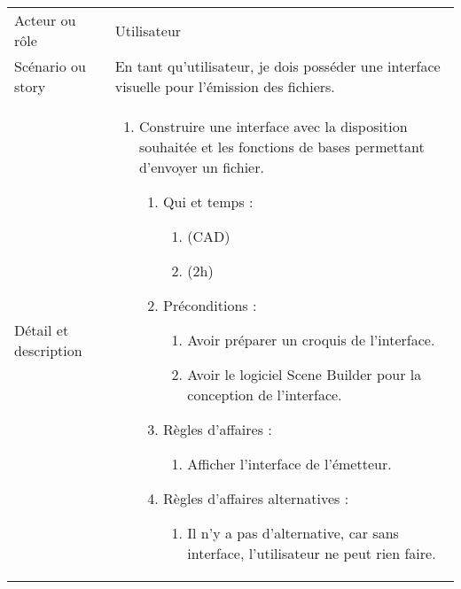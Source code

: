 \begin{longtable}{|l|p{}|}
\hline
    \rowcolor{Gray}
    \multicolumn{2}{|l|}{2} \\
\hline
    Acteur ou rôle & Utilisateur \\
\hline
    Scénario ou story & En tant qu’utilisateur, je
    dois posséder une interface
    visuelle pour l’émission des
    fichiers. \\
\hline
    Détail et description &
        \begin{enumerate}[label*=\arabic*.]
            \item Construire une interface avec
                la disposition souhaitée et les
                fonctions de bases permettant
                d’envoyer un fichier.
                \begin{enumerate}[label*=\arabic*.]
                                \item Qui et temps :
                                \begin{enumerate}[label*=\arabic*.]
                                    \item (CAD)
                                    \item (2h)
                                \end{enumerate}
                                \item Préconditions :
                                \begin{enumerate}[label*=\arabic*.]
                                    \item Avoir préparer un croquis de l'interface.
                                    \item Avoir le logiciel Scene Builder pour la conception de l'interface.
                                \end{enumerate}
                                \item Règles d'affaires :
                                \begin{enumerate}[label*=\arabic*.]
                                    \item Afficher l'interface de l'émetteur.
                                \end{enumerate}
                                \item Règles d'affaires alternatives :
                                \begin{enumerate}[label*=\arabic*.]
                                    \item Il n'y a pas d'alternative, car sans interface, l'utilisateur ne peut rien faire.

\end{enumerate}
\end{enumerate}
\end{enumerate}
\end{longtable}

